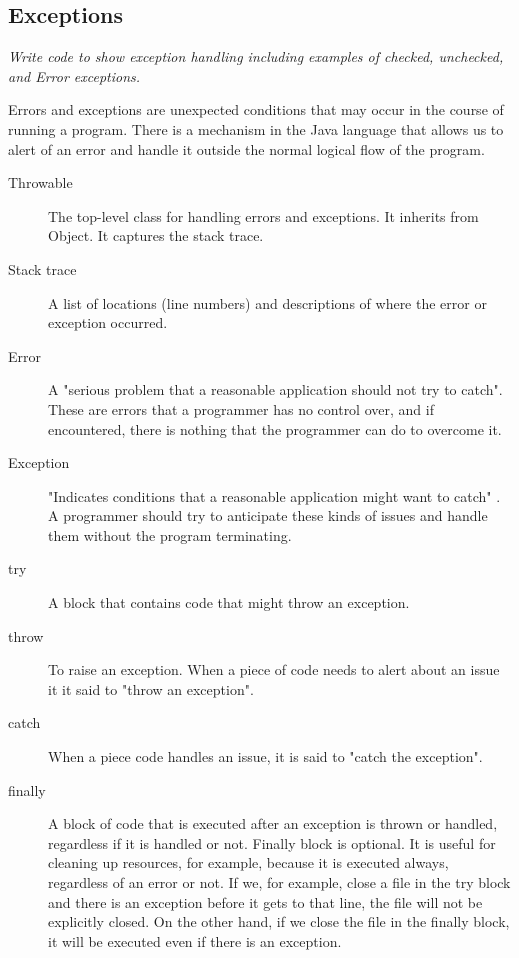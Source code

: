 \subsection{Exceptions}
\textit{Write code to show exception handling including examples of checked, unchecked, and Error exceptions.}

Errors and exceptions are unexpected conditions that may occur in the course of running a program. There is a mechanism in the Java language that allows us to alert of an error and handle it outside the normal logical flow of the program.

\begin{description}
\item[Throwable] The top-level class for handling errors and exceptions. It inherits from Object. It captures the stack trace.
\item[Stack trace] A list of locations (line numbers) and descriptions of where the error or exception occurred.
\item[Error] A "serious problem that a reasonable application should not try to catch"\cite{error}. These are errors that a programmer has no control over, and if encountered, there is nothing that the programmer can do to overcome it.
\item[Exception] "Indicates conditions that a reasonable application might want to catch" \cite{exception}. A programmer should try to anticipate these kinds of issues and handle them without the program terminating.
\item[try] A block that contains code that might throw an exception.
\item[throw] To raise an exception. When a piece of code needs to alert about an issue it it said to "throw an exception".
\item[catch] When a piece code handles an issue, it is said to "catch the exception".
\item[finally] A block of code that is executed after an exception is thrown or handled, regardless if it is handled or not.  Finally block is optional. It is useful for cleaning up resources, for example, because it is executed always, regardless of an error or not. If we, for example, close a file in the try block and there is an exception before it gets to that line, the file will not be explicitly closed. On the other hand, if we close the file in the finally block, it will be executed even if there is an exception.
\end{description}


